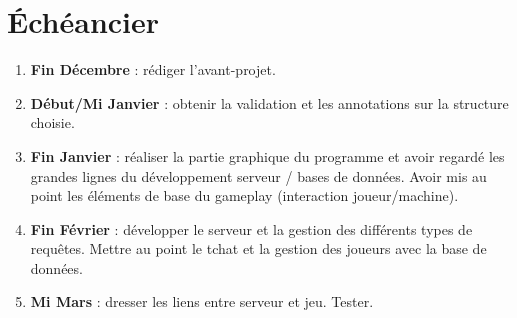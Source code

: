 \documentclass[a4paper,12pt]{report}
\begin{document}
\chapter{Échéancier}
\begin{enumerate}
    \item \textbf{Fin Décembre} : rédiger l'avant-projet.
    \item \textbf{Début/Mi Janvier} : obtenir la validation et les annotations sur la structure choisie.
    \item \textbf{Fin Janvier} : réaliser la partie graphique du programme et avoir regardé les grandes lignes du développement serveur / bases de données. Avoir mis au point les éléments de base du gameplay (interaction joueur/machine).
    \item \textbf{Fin Février} : développer le serveur et la gestion des différents types de requêtes. Mettre au point le tchat et la gestion des joueurs avec la base de données.
    \item \textbf{Mi Mars} : dresser les liens entre serveur et jeu. Tester.
\end{enumerate}
\end{document}
